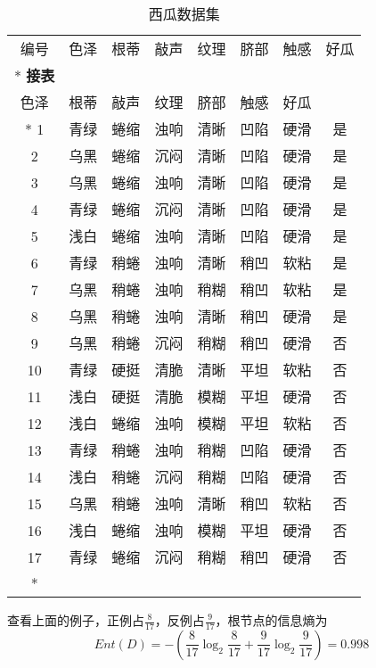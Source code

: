 \documentclass{ML}
\begin{document}
\begin{longtable}[c]{@{}cccccccc@{}}
	\toprule
	编号 & 色泽 & 根蒂 & 敲声 & 纹理 & 脐部 & 触感 & 好瓜 \\* \midrule
	\endfirsthead
	\multicolumn{7}{c}%
	{{\bfseries 接表 \thetable}}                          \\
	\toprule
	色泽 & 根蒂 & 敲声 & 纹理 & 脐部 & 触感 & 好瓜        \\* \midrule
	\endhead
	\bottomrule
	\endfoot
	\endlastfoot
	1    & 青绿 & 蜷缩 & 浊响 & 清晰 & 凹陷 & 硬滑 & 是   \\
	2    & 乌黑 & 蜷缩 & 沉闷 & 清晰 & 凹陷 & 硬滑 & 是   \\
	3    & 乌黑 & 蜷缩 & 浊响 & 清晰 & 凹陷 & 硬滑 & 是   \\
	4    & 青绿 & 蜷缩 & 沉闷 & 清晰 & 凹陷 & 硬滑 & 是   \\
	5    & 浅白 & 蜷缩 & 浊响 & 清晰 & 凹陷 & 硬滑 & 是   \\
	6    & 青绿 & 稍蜷 & 浊响 & 清晰 & 稍凹 & 软粘 & 是   \\
	7    & 乌黑 & 稍蜷 & 浊响 & 稍糊 & 稍凹 & 软粘 & 是   \\
	8    & 乌黑 & 稍蜷 & 浊响 & 清晰 & 稍凹 & 硬滑 & 是   \\
	9    & 乌黑 & 稍蜷 & 沉闷 & 稍糊 & 稍凹 & 硬滑 & 否   \\
	10   & 青绿 & 硬挺 & 清脆 & 清晰 & 平坦 & 软粘 & 否   \\
	11   & 浅白 & 硬挺 & 清脆 & 模糊 & 平坦 & 硬滑 & 否   \\
	12   & 浅白 & 蜷缩 & 浊响 & 模糊 & 平坦 & 软粘 & 否   \\
	13   & 青绿 & 稍蜷 & 浊响 & 稍糊 & 凹陷 & 硬滑 & 否   \\
	14   & 浅白 & 稍蜷 & 沉闷 & 稍糊 & 凹陷 & 硬滑 & 否   \\
	15   & 乌黑 & 稍蜷 & 浊响 & 清晰 & 稍凹 & 软粘 & 否   \\
	16   & 浅白 & 蜷缩 & 浊响 & 模糊 & 平坦 & 硬滑 & 否   \\
	17   & 青绿 & 蜷缩 & 沉闷 & 稍糊 & 稍凹 & 硬滑 & 否   \\* \bottomrule
	\caption{西瓜数据集}\label
	{tab:my-table}                                        \\
\end{longtable}

查看上面的例子，正例占$\frac{8}{17}$，反例占$\frac{9}{17}$，根节点的信息熵为$$Ent(D)=-(\frac{8}{17}\log_2{\frac{8}{17}} + {\frac{9}{17}}\log_2{\frac{9}{17}})=0.998$$
\end{document}
